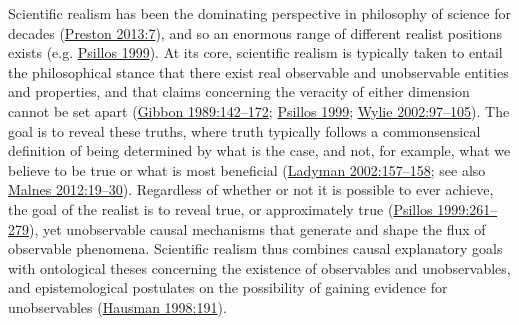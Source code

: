 \documentclass[
  a4paper,
  oneside]{uiophdthesis}
\begin{document}
Scientific realism has been the dominating perspective in philosophy of science for decades (\protect\hyperlink{ref-preston2013}{Preston 2013:7}), and so an enormous range of different realist positions exists (e.g. \protect\hyperlink{ref-psillos1999}{Psillos 1999}). At its core, scientific realism is typically taken to entail the philosophical stance that there exist real observable and unobservable entities and properties, and that claims concerning the veracity of either dimension cannot be set apart (\protect\hyperlink{ref-gibbon1989}{Gibbon 1989:142--172}; \protect\hyperlink{ref-psillos1999}{Psillos 1999}; \protect\hyperlink{ref-wylie2002}{Wylie 2002:97--105}). The goal is to reveal these truths, where truth typically follows a commonsensical definition of being determined by what is the case, and not, for example, what we believe to be true or what is most beneficial (\protect\hyperlink{ref-ladyman2002}{Ladyman 2002:157--158}; see also \protect\hyperlink{ref-malnes2012}{Malnes 2012:19--30}). Regardless of whether or not it is possible to ever achieve, the goal of the realist is to reveal true, or approximately true (\protect\hyperlink{ref-psillos1999}{Psillos 1999:261--279}), yet unobservable causal mechanisms that generate and shape the flux of observable phenomena. Scientific realism thus combines causal explanatory goals with ontological theses concerning the existence of observables and unobservables, and epistemological postulates on the possibility of gaining evidence for unobservables (\protect\hyperlink{ref-hausman1998}{Hausman 1998:191}).
\end{document}
